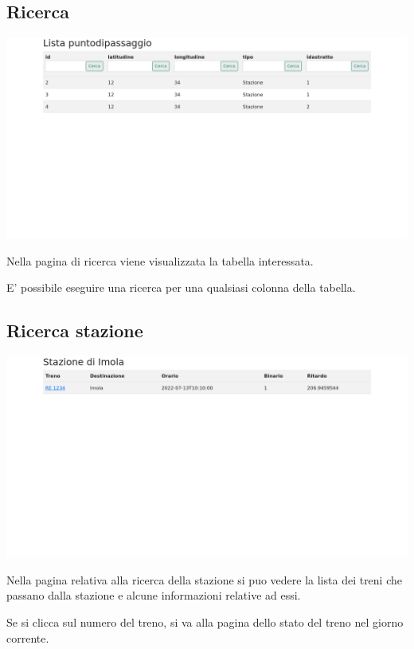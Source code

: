 \documentclass[a4paper,12pt]{report}
\begin{document}
	\subsection{Ricerca}
	\includegraphics[width=\linewidth]{res/screenshots/lista.png}
	\par Nella pagina di ricerca viene visualizzata la tabella interessata.
	\par E' possibile eseguire una ricerca per una qualsiasi colonna della tabella.
	\subsection{Ricerca stazione}
	\includegraphics[width=\linewidth]{res/screenshots/stazione.png}
	\par Nella pagina relativa alla ricerca della stazione si puo vedere la lista dei treni che passano dalla stazione e alcune informazioni relative ad essi.
	\par Se si clicca sul numero del treno, si va alla pagina dello stato del treno nel giorno corrente.
\end{document}
